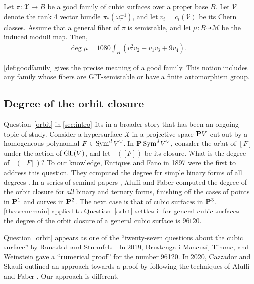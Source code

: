 \documentclass[11pt,reqno, letterpaper]{amsart}
\DeclareMathOperator{\Orb}{\overline{Orb}}
\renewcommand{\to}{{\longrightarrow}}
\numberwithin{equation}{section}
\newcommand{\V}{\mathcal V}
\newcommand{\cX}{\mathcal{X}}
\begin{document}
\begin{theorem}\label{theorem:main}
  Let $\pi \colon \cX \to B$ be a good family of cubic surfaces over a
  proper base $B$.
  Let $\V$ denote the rank 4 vector bundle
  $ \pi_* \left(\omega_\pi^{-1}\right)$, and let
  \(v_i = c_i\left(\V\right)\) be its Chern classes.  Assume that a
  general fiber of $\pi$ is semistable, and let
  $\mu \colon B \dashrightarrow \mathcal M$ be the induced moduli map.  Then,
  \begin{align}
    \deg \mu =
    \label{eq:MAIN}
    1080 \int_{B} \left(v_{1}^{2}v_{2} - v_{1}v_{3}+ 9v_{4}\right).
  \end{align}
\end{theorem}
\autoref{def:goodfamily} gives the precise meaning of a good family.  This notion includes any family whose fibers are
GIT-semistable or have a finite automorphism group.

\subsection{Degree of the orbit closure}
Question~\ref{orbit} in \autoref{sec:intro} fits in a broader story
that has been an ongoing topic of study.  Consider a hypersurface
\(X\) in a projective space $\P V$ cut out by a homogeneous polynomial
$F \in \Sym^d V^\vee$.  In $\P\Sym^dV^\vee$, consider the orbit of
$[F]$ under the action of $\GL(V)$, and let $\Orb([F])$ be its
closure.  What is the degree of $\Orb([F])$?  To our knowledge,
Enriques and Fano in 1897 were the first to address this question.
They computed the degree for simple binary forms of all degrees
\cite{enr.fan:97}.  In a series of seminal papers \cite{Aluffi1993,
  alu.fab:93, alu.fab:00}, Aluffi and Faber computed the degree of the
orbit closure for \emph{all} binary and ternary forms, finishing off
the cases of points in $\P^1$ and curves in $\P^2$.  The next case is
that of cubic surfaces in $\P^3$.  \autoref{theorem:main} applied to
Question~\ref{orbit} settles it for general cubic surfaces---the
degree of the orbit closure of a general cubic surface is $96120$.

Question~\ref{orbit} appears as one of the ``twenty-seven questions
about the cubic surface'' by Ranestad and Sturmfels \cite{ran.stu:20}.
In 2019, Brustenga i Moncus\'i, Timme, and Weinstein gave a
``numerical proof'' for the number 96120. In 2020, Cazzador and
Skauli outlined an approach towards a proof by following the
techniques of Aluffi and Faber \cite{bru-i-mon.tim.wei:20,caz.ska:20}.
Our approach is different.
\end{document}
